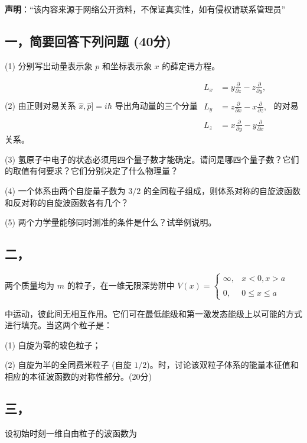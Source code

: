 
\textbf{声明}：“该内容来源于网络公开资料，不保证真实性，如有侵权请联系管理员”

\subsection{一，简要回答下列问题 (40分)}

(1) 分别写出动量表示象 $p$ 和坐标表示象 $x$ 的薛定谔方程。

(2) 由正则对易关系 $\hat{x}, \hat{p}] = i\hbar$ 导出角动量的三个分量
$\begin{aligned}    L_x &= y \frac{\partial}{\partial z} - z \frac{\partial}{\partial y}, \\\\    L_y &= z \frac{\partial}{\partial x} - x \frac{\partial}{\partial z}, \\\\    L_z &= x \frac{\partial}{\partial y} - y \frac{\partial}{\partial x}\end{aligned}$
的对易关系。

(3) 氢原子中电子的状态必须用四个量子数才能确定。请问是哪四个量子数？它们的取值有何要求？它们分别决定了什么物理量？

(4) 一个体系由两个自旋量子数为 $3/2$ 的全同粒子组成，则体系对称的自旋波函数和反对称的自旋波函数各有几个？

(5) 两个力学量能够同时测准的条件是什么？试举例说明。

\subsection{二，}两个质量均为 $m$ 的粒子，在一维无限深势阱中
$V(x) = \begin{cases} \infty, & x < 0, x > a \\\\0, & 0 \leq x \leq a \end{cases}$

中运动，彼此间无相互作用。它们可在最低能级和第一激发态能级上以可能的方式进行填充。当这两个粒子是：

(1) 自旋为零的玻色粒子；

(2) 自旋为半的全同费米粒子 (自旋 $1/2$)。时，讨论该双粒子体系的能量本征值和相应的本征波函数的对称性部分。(20分)

\subsection{三，}设初始时刻一维自由粒子的波函数为

